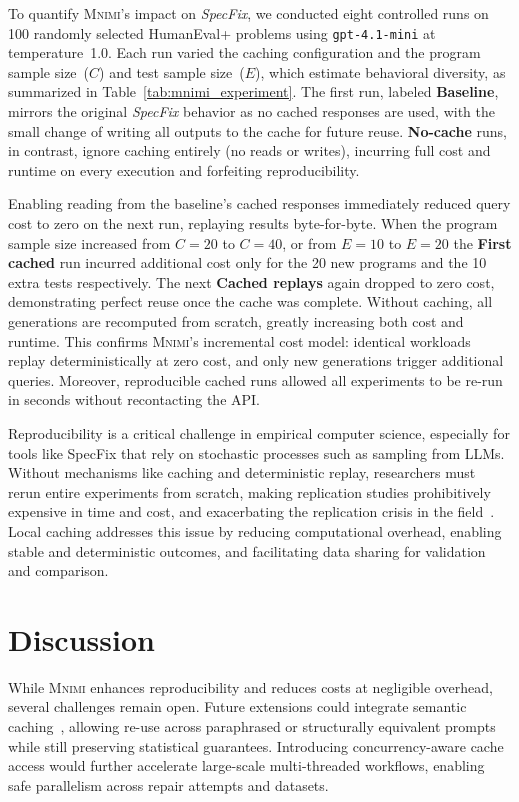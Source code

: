 \documentclass[sigconf]{acmart}
\newcommand{\projName}{\textsc{Mnimi}\xspace}
\begin{document}
To quantify \projName's impact on \textit{SpecFix}, we conducted eight controlled runs on 100 randomly selected HumanEval+ problems using \texttt{gpt-4.1-mini} at temperature~1.0.
Each run varied the caching configuration and the program sample size~($C$) and test sample size~($E$), which estimate behavioral diversity, as summarized in Table~\ref{tab:mnimi_experiment}.
The first run, labeled \textbf{Baseline}, mirrors the original \textit{SpecFix} behavior as no cached responses are used, with the small change of writing all outputs to the cache for future reuse.
\textbf{No-cache} runs, in contrast, ignore caching entirely (no reads or writes), incurring full cost and runtime on every execution and forfeiting reproducibility.

Enabling reading from the baseline’s cached responses immediately reduced query cost to zero on the next run, replaying results byte-for-byte.
When the program sample size increased from $C{=}20$ to $C{=}40$, or from $E{=}10$ to $E{=}20$  the \textbf{First cached} run incurred additional cost only for the 20 new programs and the 10 extra tests respectively. The next \textbf{Cached replays} again dropped to zero cost, demonstrating perfect reuse once the cache was complete.
Without caching, all generations are recomputed from scratch, greatly increasing both cost and runtime.
This confirms \projName’s incremental cost model: identical workloads replay deterministically at zero cost, and only new generations trigger additional queries. Moreover, reproducible cached runs allowed all experiments to be re-run in seconds without recontacting the API.

Reproducibility is a critical challenge in empirical computer science, especially for tools like SpecFix that rely on stochastic processes such as sampling from LLMs. Without mechanisms like caching and deterministic replay, researchers must rerun entire experiments from scratch, making replication studies prohibitively expensive in time and cost, and exacerbating the replication crisis in the field~\cite{cockburn2020threats}. Local caching addresses this issue by reducing computational overhead, enabling stable and deterministic outcomes, and facilitating data sharing for validation and comparison.
\section{Discussion}

While \projName enhances reproducibility and reduces costs at negligible overhead, several challenges remain open.
Future extensions could integrate semantic caching~\cite{meancache2024}, allowing re-use across paraphrased or structurally equivalent prompts while still preserving statistical guarantees.
Introducing concurrency-aware cache access would further accelerate large-scale multi-threaded workflows, enabling safe parallelism across repair attempts and datasets.  
\end{document}
